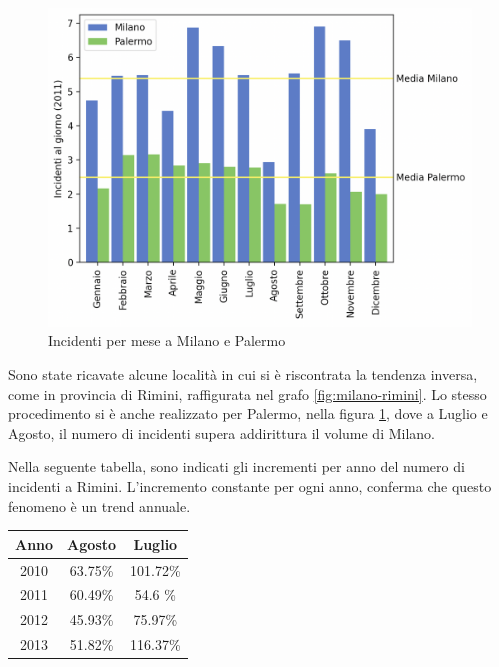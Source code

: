 \documentclass[a4paper]{report}
\begin{document}
\begin{figure}
    \includegraphics[width=\linewidth]{../src/incidenti/incidenti_senza_coords/mese_incidenti/palermo_milano.png}
    \caption{Incidenti per mese a Milano e Palermo}
    \label{fig:palermo-milano}
\end{figure}

Sono state ricavate alcune località in cui si è riscontrata la tendenza inversa, come in provincia 
di Rimini, raffigurata nel grafo \ref{fig:milano-rimini}.
Lo stesso procedimento si è anche realizzato per Palermo, nella figura \ref{fig:palermo-milano}, 
dove a Luglio e Agosto, il numero di incidenti supera addirittura il volume di Milano.

Nella seguente tabella, sono indicati gli incrementi per anno del numero di incidenti a Rimini.
L'incremento constante per ogni anno, conferma che questo fenomeno è un trend annuale.

\begin{center}
    \def\arraystretch{1.5}%
    \begin{tabular}{ |c|c|c| } 
    \hline
    Anno & Agosto & Luglio \\ 
    \hline
    \rowcolor{TableGray}
    2010 & 63.75\% & 101.72\% \\ 
    2011 & 60.49\% & 54.6 \%  \\
    \rowcolor{TableGray}
    2012 & 45.93\% & 75.97\%  \\
    2013 & 51.82\% & 116.37\% \\
    \hline
    \end{tabular}
\end{center}
\end{document}
